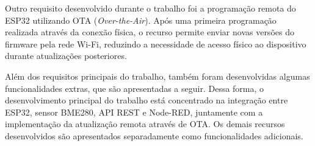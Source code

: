 Outro requisito desenvolvido durante o trabalho foi a programação remota do ESP32 utilizando OTA (\textit{Over-the-Air}). Após uma primeira programação realizada através da conexão física, o recurso permite enviar novas versões do firmware pela rede Wi-Fi, reduzindo a necessidade de acesso físico ao dispositivo durante atualizações posteriores.

Além dos requisitos principais do trabalho, também foram desenvolvidas algumas funcionalidades extras, que são apresentadas a seguir.
Dessa forma, o desenvolvimento principal do trabalho está concentrado na integração entre ESP32, sensor BME280, API REST e Node-RED, juntamente com a implementação da atualização remota através de OTA. Os demais recursos desenvolvidos são apresentados separadamente como funcionalidades adicionais.
